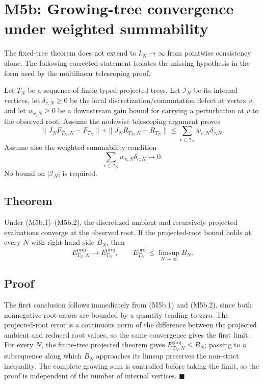 \section*{M5b: Growing-tree convergence under weighted summability}

The fixed-tree theorem does not extend to $k_N\to\infty$ from pointwise
consistency alone. The following corrected statement isolates the missing
hypothesis in the form used by the multilinear telescoping proof.

Let $T_N$ be a sequence of finite typed projected trees. Let $\mathcal I_N$
be its internal vertices, let $\delta_{v,N}\ge0$ be the local
discretization/commutation defect at vertex $v$, and let $w_{v,N}\ge0$ be a
downstream gain bound for carrying a perturbation at $v$ to the observed
root. Assume the nodewise telescoping argument proves
\[
 \|J_NF_{T_N,N}-F_{T_N}\|+
 \|J_NR_{T_N,N}-R_{T_N}\|
 \le \sum_{v\in\mathcal I_N}w_{v,N}\delta_{v,N}.
 \tag{M5b.1}
\]
Assume also the weighted summability condition
\[
 \boxed{\quad\sum_{v\in\mathcal I_N}w_{v,N}\delta_{v,N}\longrightarrow0.\quad}
 \tag{M5b.2}
\]
No bound on $|\mathcal I_N|$ is required.

\subsection*{Theorem}

Under (M5b.1)--(M5b.2), the discretized ambient and recursively projected
evaluations converge at the observed root. If the projected-root bound holds
at every $N$ with right-hand side $B_N$, then
\[
 E_{T_N,N}^{\mathrm{proj}}\longrightarrow E_{T_N}^{\mathrm{proj}},
 \qquad
 E_{T_N}^{\mathrm{proj}}\le\limsup_{N\to\infty}B_N.
\]

\subsection*{Proof}

The first conclusion follows immediately from (M5b.1) and (M5b.2), since
both nonnegative root errors are bounded by a quantity tending to zero. The
projected-root error is a continuous norm of the difference between the
projected ambient and reduced root values, so the same convergence gives the
first limit. For every $N$, the finite-tree projected theorem gives
$E_{T_N,N}^{\mathrm{proj}}\le B_N$; passing to a subsequence along which
$B_N$ approaches its limsup preserves the non-strict inequality. The complete
growing sum is controlled before taking the limit, so the proof is independent
of the number of internal vertices. $\blacksquare$

